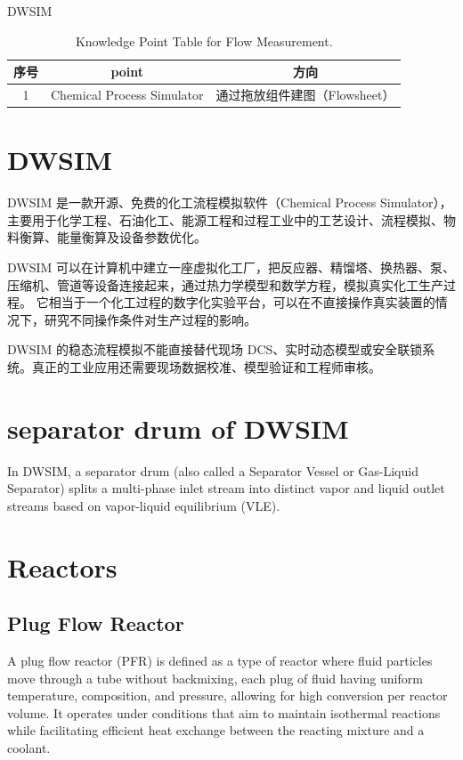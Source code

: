 \documentclass{book}
\begin{document}
\tableofcontents
\clearpage

DWSIM

\begin{table}[htbp]
\centering
\begin{tabular}{c c c} 
\toprule
序号 & point & 方向\\ [0.5ex] 
\midrule
1 & Chemical Process Simulator & 通过拖放组件建图（Flowsheet）\\
\end{tabular}
\caption{Knowledge Point Table for Flow Measurement.}
\label{table:pipeline-knowledge}
\end{table}

\chapter{DWSIM}

DWSIM 是一款开源、免费的化工流程模拟软件（Chemical Process Simulator），主要用于化学工程、石油化工、能源工程和过程工业中的工艺设计、流程模拟、物料衡算、能量衡算及设备参数优化。

DWSIM 可以在计算机中建立一座虚拟化工厂，把反应器、精馏塔、换热器、泵、压缩机、管道等设备连接起来，通过热力学模型和数学方程，模拟真实化工生产过程。
它相当于一个化工过程的数字化实验平台，可以在不直接操作真实装置的情况下，研究不同操作条件对生产过程的影响。

DWSIM 的稳态流程模拟不能直接替代现场 DCS、实时动态模型或安全联锁系统。真正的工业应用还需要现场数据校准、模型验证和工程师审核。

\chapter{separator drum of DWSIM}

In DWSIM, a separator drum (also called a Separator Vessel or Gas-Liquid Separator) 
splits a multi-phase inlet stream into distinct vapor and liquid outlet streams 
based on vapor-liquid equilibrium (VLE).

\chapter{Reactors}

\section{Plug Flow Reactor}

A plug flow reactor (PFR) is defined as a type of reactor where fluid particles move through a tube without backmixing, each plug of fluid having uniform temperature, composition, and pressure, allowing for high conversion per reactor volume. It operates under conditions that aim to maintain isothermal reactions while facilitating efficient heat exchange between the reacting mixture and a coolant.
\end{document}
